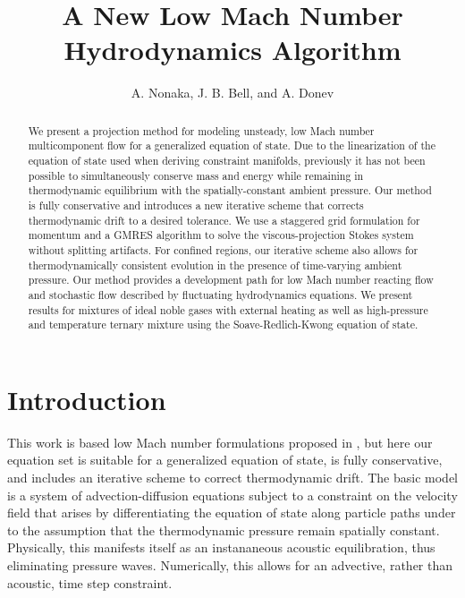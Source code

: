 \documentclass[final]{siamltex}
\begin{document}
\title{A New Low Mach Number Hydrodynamics Algorithm}

\author{A. Nonaka\footnotemark[1],
        J. B. Bell\footnotemark[1], and
        A. Donev\footnotemark[2]}

\renewcommand{\thefootnote}{\fnsymbol{footnote}}


\maketitle

\begin{abstract}
We present a projection method for modeling unsteady, low Mach number multicomponent
flow for a generalized equation of state.
Due to the linearization of the equation of state used when deriving
constraint manifolds, previously it has
not been possible to simultaneously conserve mass and energy while remaining in 
thermodynamic equilibrium with the spatially-constant ambient pressure.
Our method is fully conservative and introduces a new iterative scheme that 
corrects thermodynamic drift to a desired tolerance.  
We use a staggered grid formulation for momentum and a GMRES algorithm to
solve the viscous-projection Stokes system without splitting artifacts.
For confined regions, our iterative scheme also allows for thermodynamically 
consistent evolution in the presence of time-varying ambient pressure.
Our method provides a development path for low Mach number reacting flow and 
stochastic flow described by fluctuating hydrodynamics equations.
We present results for mixtures of ideal noble gases with external heating
as well as high-pressure and temperature ternary mixture using the 
Soave-Redlich-Kwong equation of state.
\end{abstract}

\section{Introduction}
 This work is based low Mach number formulations proposed in
\cite{RehmBaum,MajdaSethian}, but here our equation set is suitable for a
generalized equation of state, is fully conservative, and includes an iterative
scheme to correct thermodynamic drift.
The basic model is a system of advection-diffusion equations
subject to a constraint on the velocity field that arises by differentiating
the equation of state along particle paths under to the assumption
that the thermodynamic pressure remain spatially constant.  Physically, this
manifests itself as an instananeous acoustic equilibration, thus eliminating
pressure waves.  Numerically, this allows for an advective, rather than acoustic,
time step constraint.
\end{document}
